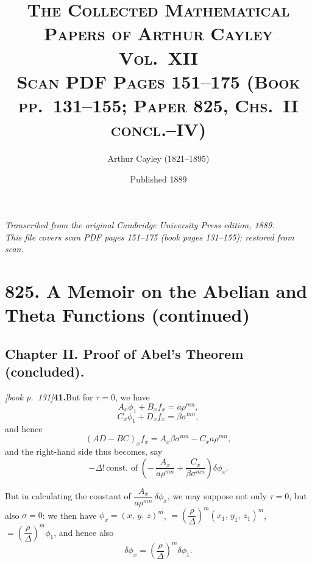 \documentclass[11pt,a4paper]{article}
\theoremstyle{plain}
\theoremstyle{definition}
\theoremstyle{remark}
\begin{document}
\title{\scshape The Collected Mathematical Papers of Arthur Cayley\\Vol.\ XII\\[0.5em]\large Scan PDF Pages 151--175 (Book pp.\ 131--155; Paper 825, Chs.\ II concl.--IV)}
\author{Arthur Cayley (1821--1895)}
\date{Published 1889}
\maketitle

\thispagestyle{empty}
\begin{center}
\textit{Transcribed from the original Cambridge University Press edition, 1889.}\\
\textit{This file covers scan PDF pages 151--175 (book pages 131--155); restored from scan.}
\end{center}

\tableofcontents
\newpage

\section*{825. A Memoir on the Abelian and Theta Functions (continued)}

\subsection*{Chapter II. Proof of Abel's Theorem (concluded).}

\noindent\textit{[book p.~131]}\quad \textbf{41.}\quad But for $\tau = 0$, we have
\[
A_x\phi_1 + B_x f_x = a\rho^{mn},
\]
\[
C_x\phi_1 + D_x f_x = \beta\sigma^{mn},
\]
and hence
\[
(AD - BC)_x f_x = A_x\beta\sigma^{mn} - C_x a\rho^{mn},
\]
and the right-hand side thus becomes, say
\[
-\Delta!\,\text{const.\ of}\;\left(-\,\frac{A_x}{a\rho^{mn}} + \frac{C_x}{\beta\sigma^{mn}}\right)\delta\phi_x.
\]

But in calculating the constant of $\dfrac{A_x}{a\rho^{mn}}\,\delta\phi_x$, we may suppose not only $\tau = 0$, but also $\sigma = 0$: we then have $\phi_x = (x,\,y,\,z)^m$, $= \left(\dfrac{\rho}{\Delta}\right)^m (x_1,\,y_1,\,z_1)^m$, $= \left(\dfrac{\rho}{\Delta}\right)^m \phi_1$, and hence also
\[
\delta\phi_x = \left(\frac{\rho}{\Delta}\right)^m \delta\phi_1.
\]
\end{document}
